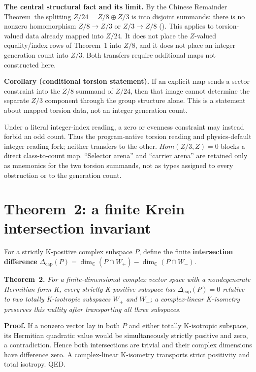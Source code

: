 \documentclass[11pt]{article}
\theoremstyle{remark}
\begin{document}
\textbf{The central structural fact and its limit.} By the Chinese Remainder Theorem~the splitting $Z/24 = Z/8 \oplus Z/3$ is into disjoint summands: there is no nonzero homomorphism $Z/8 \to Z/3$ or $Z/3 \to Z/8$ (). This applies to torsion-valued data already mapped into $Z/24$. It does not place the $Z$-valued equality/index rows of Theorem~1 into $Z/8$, and it does not place an integer generation count into $Z/3$. Both transfers require additional maps not constructed here.

\textbf{Corollary (conditional torsion statement).} If an explicit map sends a sector constraint into the $Z/8$ summand of $Z/24$, then that image cannot determine the separate $Z/3$ component through the group structure alone. This is a statement about mapped torsion data, not an integer generation count.

Under a literal integer-index reading, a zero or evenness constraint may instead forbid an odd count. Thus the program-native torsion reading and physics-default integer reading fork; neither transfers to the other. $Hom(Z/3,Z)=0$ blocks a direct class-to-count map. ``Selector arena'' and ``carrier arena'' are retained only as mnemonics for the two torsion summands, not as types assigned to every obstruction or to the generation count.

\section{Theorem~2: a finite Krein intersection invariant}
For a strictly K-positive complex subspace $P$, define the finite \textbf{intersection difference} $\Delta_{\mathrm{cap}}(P)=\dim_{\mathbb C}(P\cap W_+)-\dim_{\mathbb C}(P\cap W_-)$.

\textbf{Theorem~2.} \emph{For a finite-dimensional complex vector space with a nondegenerate Hermitian form K, every strictly K-positive subspace has $\Delta_{\mathrm{cap}}(P)=0$ relative to two totally K-isotropic subspaces $W_+$ and $W_-$; a complex-linear K-isometry preserves this nullity after transporting all three subspaces.}

\textbf{Proof.} If a nonzero vector lay in both $P$ and either totally K-isotropic subspace, its Hermitian quadratic value would be simultaneously strictly positive and zero, a contradiction. Hence both intersections are trivial and their complex dimensions have difference zero. A complex-linear K-isometry transports strict positivity and total isotropy. QED.
\end{document}
